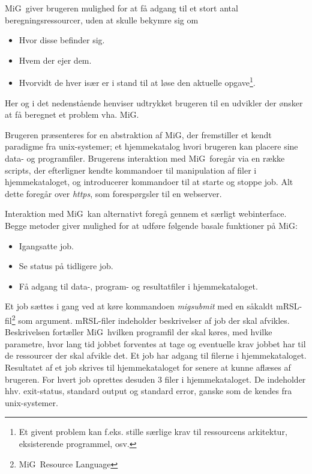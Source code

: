 \documentclass[final,a4paper,11pt]{article}
\newcommand{\mig}{MiG}
\begin{document}


\mig\ giver brugeren mulighed for at få adgang til et stort antal beregningsressourcer, uden at skulle bekymre sig om 
\begin{itemize}
	\item Hvor disse befinder sig.
	\item Hvem der ejer dem.
	\item Hvorvidt de hver især er i stand til at løse den aktuelle opgave\footnote{Et givent problem kan f.eks. stille særlige krav til ressourcens arkitektur, eksisterende programmel, osv.}.
\end{itemize}
Her og i det nedenstående henviser udtrykket brugeren til en udvikler der ønsker at få beregnet et problem vha. \mig. 

Brugeren præsenteres for en abstraktion af \mig, der fremstiller et kendt paradigme fra unix-systemer; et hjemmekatalog hvori brugeren kan placere sine data- og programfiler. Brugerens interaktion med \mig\ foregår via en række scripts, der efterligner kendte kommandoer til manipulation af filer i hjemmekataloget, og introducerer kommandoer til at starte og stoppe job. Alt dette foregår over \emph{https}, som forespørgsler til en webserver. 

Interaktion med \mig\ kan alternativt foregå gennem et særligt webinterface. 
Begge metoder giver mulighed for at udføre følgende basale funktioner på \mig:
\begin{itemize}
	\item Igangsatte job.

	\item Se status på tidligere job.

	\item Få adgang til data-, program- og resultatfiler i hjemmekataloget. 
\end{itemize}

Et job sættes i gang ved at køre kommandoen \emph{migsubmit} med en såkaldt mRSL-fil\footnote{\mig\ Resource Language} som argument. mRSL-filer indeholder beskrivelser af job der skal afvikles. Beskrivelsen fortæller \mig\ hvilken programfil der skal køres, med hvilke parametre, hvor lang tid jobbet forventes at tage og eventuelle krav jobbet har til de ressourcer der skal afvikle det. Et job har adgang til filerne i  hjemmekataloget. Resultatet af et job skrives til hjemmekataloget for senere at kunne aflæses af brugeren. For hvert job oprettes desuden 3 filer i hjemmekataloget. De indeholder hhv. exit-status, standard output og standard error, ganske som de kendes fra unix-systemer.
\end{document}
